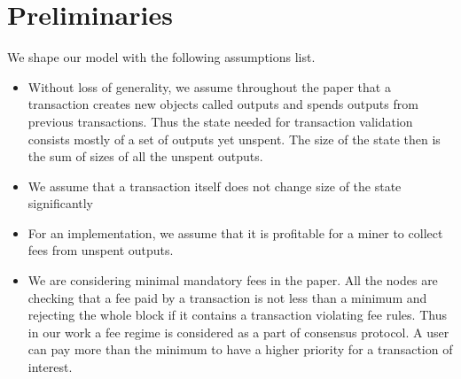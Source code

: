 \documentclass[]{llncs}   %
\begin{document}

\section{Preliminaries}
\label{sec:preliminaries}

We shape our model with the following assumptions list.
\begin{itemize}%
  \item \label{a:utxo} Without loss of generality, we assume throughout the paper that a transaction creates new objects called outputs and spends outputs from previous transactions. Thus the state needed for transaction validation consists mostly of a set of outputs yet unspent. The size of the state then is the sum of sizes of all the unspent outputs.  
  \item \label{a:state} We assume that a transaction itself does not change size of the state significantly
  \item \label{a:miner} For an implementation, we assume that it is profitable for a miner to collect fees from unspent outputs. 
  \item \label{a:minimal} We are considering minimal mandatory fees in the paper. All the nodes
      are checking that a fee paid by a transaction is not less than a minimum
      and rejecting the whole block if it contains a transaction violating fee
      rules. Thus in our work a fee regime is considered as a part of consensus protocol. A user can pay more than the minimum to have a higher priority
      for a transaction of interest.
\end{itemize}
\end{document}

